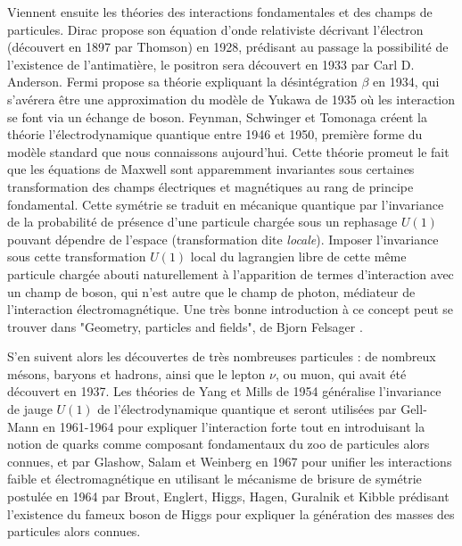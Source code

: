 		    Viennent ensuite les théories des interactions fondamentales et des champs de particules. Dirac propose son équation d'onde relativiste décrivant l'électron\cite{Dirac1928} (découvert en 1897 par Thomson\cite{Thomson1987}) en 1928, prédisant au passage la possibilité de l'existence de l'antimatière, le positron sera découvert en 1933 par Carl D. Anderson\cite{Anderson1933}. Fermi propose sa théorie expliquant la désintégration $\beta$ en 1934\cite{Fermi1934}, qui s'avérera être une approximation du modèle de Yukawa de 1935\cite{Yukawa1935} où les interaction se font via un échange de boson. Feynman, Schwinger et Tomonaga\cite{Tomonaga1946,Schwinger1948,Feynman1998} créent la théorie l'électrodynamique quantique entre 1946 et 1950, première forme du modèle standard que nous connaissons aujourd’hui. Cette théorie promeut le fait que les équations de Maxwell sont apparemment invariantes sous certaines transformation des champs électriques et magnétiques au rang de principe fondamental. Cette symétrie se traduit en mécanique quantique par l'invariance de la probabilité de présence d'une particule chargée sous un rephasage $U(1)$ pouvant dépendre de l'espace (transformation dite \textit{locale}). Imposer l'invariance sous cette transformation $U(1)$ local du lagrangien libre de cette même particule chargée abouti naturellement à l'apparition de termes d'interaction avec un champ de boson, qui n'est autre que le champ de photon, médiateur de l'interaction électromagnétique. Une très bonne introduction à ce concept peut se trouver dans "Geometry, particles and fields", de Bjorn Felsager \cite{felsager}.
		    
		    S'en suivent alors les découvertes de très nombreuses particules : de nombreux mésons, baryons et  hadrons, ainsi que le lepton $\nu$, ou muon, qui avait été découvert en 1937\cite{Street1937}. Les théories de Yang et Mills de 1954\cite{Yang1954} généralise l'invariance de jauge $U(1)$ de l'électrodynamique quantique et seront utilisées par Gell-Mann en 1961-1964\cite{Glashow1961,Gell-Mann1964} pour expliquer l'interaction forte tout en introduisant la notion de quarks comme composant fondamentaux du zoo de particules alors connues, et par Glashow, Salam et Weinberg en 1967\cite{Glashow1961a,Salam1964,Weinberg1967} pour unifier les interactions faible et électromagnétique en utilisant le mécanisme de brisure de symétrie postulée en 1964 par  Brout, Englert, Higgs, Hagen, Guralnik et Kibble\cite{Englert1964,Higgs1964,Higgs1964a,Kibble1967} prédisant l'existence du fameux boson de Higgs pour expliquer la génération des masses des particules alors connues. 
		    
